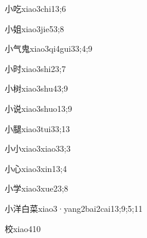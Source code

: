 \begin{verbete}{小吃}{xiao3chi1}{3;6}
\end{verbete}

\begin{verbete}{小姐}{xiao3jie5}{3;8}
\end{verbete}

\begin{verbete}{小气鬼}{xiao3qi4gui3}{3;4;9}
\end{verbete}

\begin{verbete}{小时}{xiao3shi2}{3;7}
\end{verbete}

\begin{verbete}{小树}{xiao3shu4}{3;9}
\end{verbete}

\begin{verbete}{小说}{xiao3shuo1}{3;9}
\end{verbete}

\begin{verbete}{小腿}{xiao3tui3}{3;13}
\end{verbete}

\begin{verbete}{小小}{xiao3xiao3}{3;3}
\end{verbete}

\begin{verbete}{小心}{xiao3xin1}{3;4}
\end{verbete}

\begin{verbete}{小学}{xiao3xue2}{3;8}
\end{verbete}

\begin{verbete}{小洋白菜}{xiao3·yang2bai2cai1}{3;9;5;11}
\end{verbete}

\begin{verbete}{校}{xiao4}{10}
\end{verbete}

